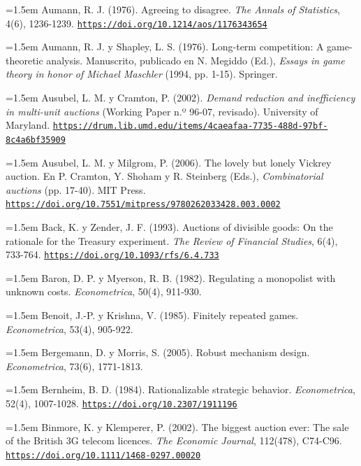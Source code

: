\documentclass[10pt,a4paper]{article}
\begin{document}
\noindent\hangindent=1.5em Aumann, R. J. (1976). Agreeing to disagree. \textit{The Annals of Statistics}, 4(6), 1236-1239. \href{https://doi.org/10.1214/aos/1176343654}{\nolinkurl{https://doi.org/10.1214/aos/1176343654}}

\noindent\hangindent=1.5em Aumann, R. J. y Shapley, L. S. (1976). Long-term competition: A game-theoretic analysis. Manuscrito, publicado en N. Megiddo (Ed.), \textit{Essays in game theory in honor of Michael Maschler} (1994, pp. 1-15). Springer.

\noindent\hangindent=1.5em Ausubel, L. M. y Cramton, P. (2002). \textit{Demand reduction and inefficiency in multi-unit auctions} (Working Paper n.º 96-07, revisado). University of Maryland. \href{https://drum.lib.umd.edu/items/4caeafaa-7735-488d-97bf-8c4a6bf35909}{\nolinkurl{https://drum.lib.umd.edu/items/4caeafaa-7735-488d-97bf-8c4a6bf35909}}

\noindent\hangindent=1.5em Ausubel, L. M. y Milgrom, P. (2006). The lovely but lonely Vickrey auction. En P. Cramton, Y. Shoham y R. Steinberg (Eds.), \textit{Combinatorial auctions} (pp. 17-40). MIT Press. \href{https://doi.org/10.7551/mitpress/9780262033428.003.0002}{\nolinkurl{https://doi.org/10.7551/mitpress/9780262033428.003.0002}}

\noindent\hangindent=1.5em Back, K. y Zender, J. F. (1993). Auctions of divisible goods: On the rationale for the Treasury experiment. \textit{The Review of Financial Studies}, 6(4), 733-764. \href{https://doi.org/10.1093/rfs/6.4.733}{\nolinkurl{https://doi.org/10.1093/rfs/6.4.733}}

\noindent\hangindent=1.5em Baron, D. P. y Myerson, R. B. (1982). Regulating a monopolist with unknown costs. \textit{Econometrica}, 50(4), 911-930.

\noindent\hangindent=1.5em Benoit, J.-P. y Krishna, V. (1985). Finitely repeated games. \textit{Econometrica}, 53(4), 905-922.

\noindent\hangindent=1.5em Bergemann, D. y Morris, S. (2005). Robust mechanism design. \textit{Econometrica}, 73(6), 1771-1813.

\noindent\hangindent=1.5em Bernheim, B. D. (1984). Rationalizable strategic behavior. \textit{Econometrica}, 52(4), 1007-1028. \href{https://doi.org/10.2307/1911196}{\nolinkurl{https://doi.org/10.2307/1911196}}

\noindent\hangindent=1.5em Binmore, K. y Klemperer, P. (2002). The biggest auction ever: The sale of the British 3G telecom licences. \textit{The Economic Journal}, 112(478), C74-C96. \href{https://doi.org/10.1111/1468-0297.00020}{\nolinkurl{https://doi.org/10.1111/1468-0297.00020}}
\end{document}

